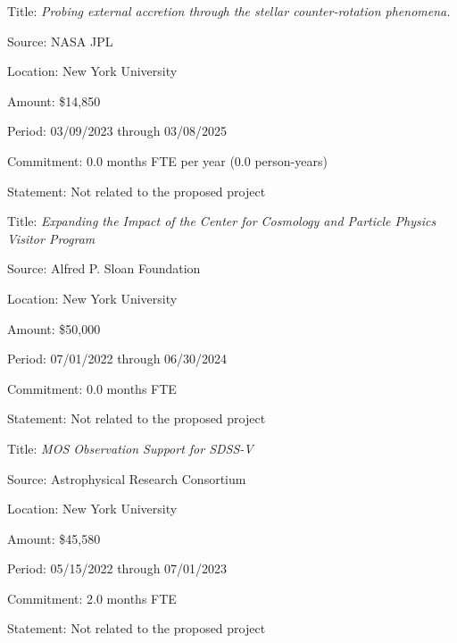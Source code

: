 \documentclass[12pt, preprint]{hacked-aastex}
\begin{document}
\begin{itemize*}
\item[]{Title: {\em Probing external accretion  through the stellar
    counter-rotation phenomena.}}
\item[]{Source: NASA JPL}
\item[]{Location: New York University}
\item[]{Amount: \$14,850}
\item[]{Period: 03/09/2023 through 03/08/2025}
\item[]{Commitment: 0.0 months FTE per year (0.0 person-years)}
\item[]{Statement: Not related to the proposed project}
\end{itemize*}

\begin{itemize*}
\item[]{Title: {\em Expanding the Impact of the Center for Cosmology
    and Particle Physics Visitor Program}}
\item[]{Source: Alfred P. Sloan Foundation}
\item[]{Location: New York University}
\item[]{Amount: \$50,000}
\item[]{Period: 07/01/2022 through 06/30/2024}
\item[]{Commitment: 0.0 months FTE}
\item[]{Statement: Not related to the proposed project}
\end{itemize*}

\begin{itemize*}
\item[]{Title: {\em MOS Observation Support for SDSS-V}}
\item[]{Source: Astrophysical Research Consortium}
\item[]{Location: New York University}
\item[]{Amount: \$45,580}
\item[]{Period: 05/15/2022 through 07/01/2023}
\item[]{Commitment: 2.0 months FTE}
\item[]{Statement: Not related to the proposed project}
\end{itemize*}
\end{document}
